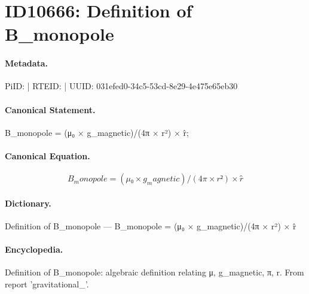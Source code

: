 \section*{ID10666: Definition of B\_monopole}
\paragraph{Metadata.}
PiID:  | RTEID:  | UUID: 031efed0-34c5-53cd-8e29-4e475e65eb30

\paragraph{Canonical Statement.}
B\_monopole = (μ₀ × g\_magnetic)/(4π × r²) × r̂;

\paragraph{Canonical Equation.}
\[
B_monopole = (μ₀ × g_magnetic)/(4π × r²) × r̂
\]

\paragraph{Dictionary.}
Definition of B\_monopole — B\_monopole = (μ₀ × g\_magnetic)/(4π × r²) × r̂

\paragraph{Encyclopedia.}
Definition of B\_monopole: algebraic definition relating μ, g\_magnetic, π, r. From report 'gravitational\_'.
